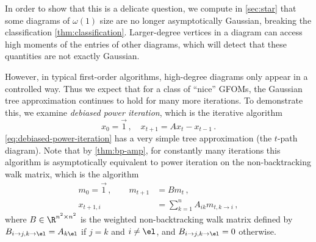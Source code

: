 \documentclass[12pt]{article}
\begin{document}
In order to show that this is a delicate question, we compute in \cref{sec:star}
that some diagrams of $\omega(1)$ size are no longer asymptotically Gaussian,
breaking the classification \cref{thm:classification}.
Larger-degree vertices in a diagram can access high moments
of the entries of other diagrams, which will detect that these quantities are not exactly Gaussian.


However, in typical first-order algorithms, high-degree diagrams only appear in a controlled way.
Thus we expect that for a class of ``nice'' GFOMs, the Gaussian tree approximation
continues to hold for many more iterations.
To demonstrate this, we examine \textit{debiased power iteration}, which is the iterative algorithm
\begin{equation}
     x_0=\vec{1}\,,\quad x_{t+1} = Ax_t - x_{t-1}\,.\label{eq:debiased-power-iteration}
\end{equation}
\cref{eq:debiased-power-iteration}
has a very simple tree approximation (the $t$-path diagram).
Note that by \cref{thm:bp-amp}, for constantly many iterations this algorithm is asymptotically equivalent to power iteration
on the non-backtracking walk matrix, which is the algorithm
\begin{align*}
    m_{0} = \vec{1}\,, \qquad m_{t+1} &= B m_{t}\,,\\
    x_{t+1,i} &= \sum_{k = 1}^n A_{ik} m_{t,k \to i}\,,
\end{align*}
where $B \in \R^{n^2 \times n^2}$ is the weighted non-backtracking walk matrix defined by $B_{i\to j,k\to \el} = A_{k\el}$ if $j=k$ and $i\neq \el$, and $B_{i\to j,k\to\el}=0$ otherwise.
\end{document}
